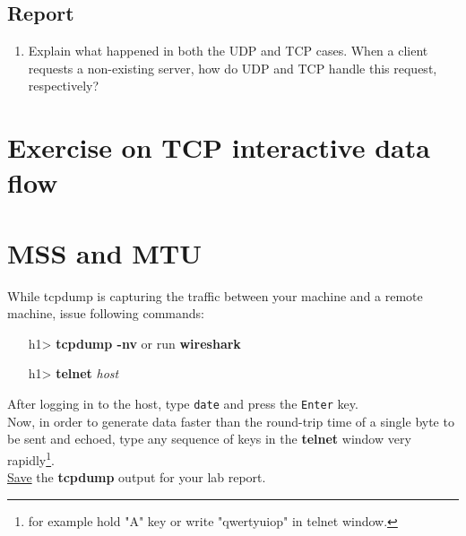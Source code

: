 \documentclass[10pt,a4paper]{article}
\numberwithin{equation}{section}
\numberwithin{figure}{section}
\numberwithin{table}{section}
\begin{document}
    \subsection*{Report}
    \begin{enumerate}
        \item Explain what happened in both the UDP and TCP cases. When a client requests a non-existing server, how do UDP and TCP handle this request, respectively?
    \end{enumerate}

\section*{Exercise on TCP interactive data flow}
\section{MSS and MTU}
While tcpdump is capturing the traffic between your machine and a remote machine, issue following commands:
    \begin{itemize}
        \item [h1>] \textbf{tcpdump -nv} or run \textbf{wireshark}
        \item [h1>] \textbf{telnet} \textit{host}
    \end{itemize}
    After logging in to the host, type \texttt{date} and press the \texttt{Enter} key. \\
    Now, in order to generate data faster than the round-trip time of a single byte to be sent and echoed, type any sequence of keys in the \textbf{telnet} window very rapidly\footnote{for example hold "A" key or write "qwertyuiop" in telnet window.}. \\
    \underline{Save} the \textbf{tcpdump} output for your lab report.
\end{document}
